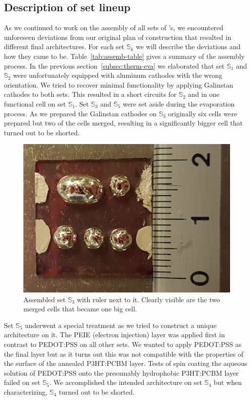 \documentclass[a4paper,10pt,twocolumn]{article}
\begin{document}
\begin{extract*}
\subsection{Description of set lineup}
As we continued to work on the assembly of all sets of \BHSC's, we encountered unforeseen deviations from our original plan of construction that resulted in different final architectures. For each set $\mathbb{S}_k$ we will describe the deviations and how they came to be. Table~\ref{tab:assemb-table} gives a summary of the assembly process.\mypar
In the previous section~\ref{subsec:therm-eva} we elaborated that set $\mathbb{S}_1$ and $\mathbb{S}_2$ were unfortunately equipped with aluminum cathodes with the wrong orientation. We tried to recover minimal functionality by applying Galinstan cathodes to both sets. This resulted in a short circuits for $\mathbb{S}_2$ and in one functional cell on set $\mathbb{S}_1$.\mypar
Set $\mathbb{S}_3$ and $\mathbb{S}_5$ were set aside during the evaporation process. As we prepared the Galinstan cathodes on $\mathbb{S}_3$ originally six cells were prepared but two of the cells merged, resulting in a significantly bigger cell that turned out to be shorted.

\begin{figure}[h]\centering
	\includegraphics[width=0.9\columnwidth]{../1_Pictures/cell3.png}
	\caption{Assembled set $\mathbb{S}_3$ with ruler next to it. Clearly visible are the two merged cells that became one big cell.}
\end{figure}
Set $\mathbb{S}_5$ underwent a special treatment as we tried to construct a unique architecture on it. The PEIE (electron injection) layer was applied first in contrast to PEDOT:PSS on all other sets. We wanted to apply PEDOT:PSS as the final layer but as it turns out this was not compatible with the properties of the surface of the annealed P3HT:PCBM layer. Tests of spin coating the aqueous solution of PEDOT:PSS onto the presumably hydrophobic P3HT:PCBM layer failed on set $\mathbb{S}_5$.\mypar
We accomplished the intended architecture on set $\mathbb{S}_4$ but when characterizing, $\mathbb{S}_4$ turned out to be shorted.

\end{extract*}
\end{document}
